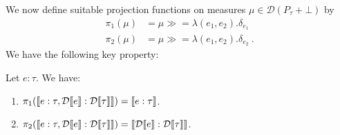 We now define suitable projection functions on measures $\mu \in \mathcal{D}(P_{\tau} + \bot)$ by 
%
\begin{align}
	 \pi_1(\mu) &{}={} \mu \gg\!= \lambda(e_1,e_2). \delta_{e_1} \\
	 \pi_2(\mu) &{}={} \mu \gg\!= \lambda(e_1,e_2). \delta_{e_2}~.
\end{align}
%
%
We have the following key property:
%
\begin{lemma}
	\label{lem:small_step_coupling_props}
	Let $e:\tau$. We have:
	\begin{enumerate}
		\item\label{lem:small_step_coupling_props1} $\pi_1(\llbracket e:\tau, \mathcal{D}\llbracket e \rrbracket : \mathcal{D}\llbracket \tau \rrbracket \rrbracket) = \llbracket e:\tau \rrbracket$.
		\item\label{lem:small_step_coupling_props2} $\pi_2(\llbracket e:\tau, \mathcal{D}\llbracket e \rrbracket : \mathcal{D}\llbracket \tau \rrbracket \rrbracket) = \llbracket \mathcal{D}\llbracket e \rrbracket:\mathcal{D}\llbracket \tau \rrbracket \rrbracket$.
	\end{enumerate}
\end{lemma}
%
